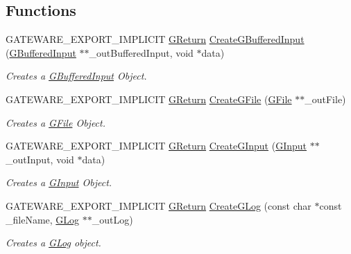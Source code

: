 \subsection*{Functions}
\begin{DoxyCompactItemize}
\item 
G\+A\+T\+E\+W\+A\+R\+E\+\_\+\+E\+X\+P\+O\+R\+T\+\_\+\+I\+M\+P\+L\+I\+C\+IT \hyperlink{namespaceGW_a67a839e3df7ea8a5c5686613a7a3de21}{G\+Return} \hyperlink{namespaceGW_1_1SYSTEM_aa8de0c8b9ee3439fb45a4235a8aaa88f}{Create\+G\+Buffered\+Input} (\hyperlink{classGW_1_1SYSTEM_1_1GBufferedInput}{G\+Buffered\+Input} $\ast$$\ast$\+\_\+out\+Buffered\+Input, void $\ast$data)
\begin{DoxyCompactList}\small\item\em Creates a \hyperlink{classGW_1_1SYSTEM_1_1GBufferedInput}{G\+Buffered\+Input} Object. \end{DoxyCompactList}\item 
G\+A\+T\+E\+W\+A\+R\+E\+\_\+\+E\+X\+P\+O\+R\+T\+\_\+\+I\+M\+P\+L\+I\+C\+IT \hyperlink{namespaceGW_a67a839e3df7ea8a5c5686613a7a3de21}{G\+Return} \hyperlink{namespaceGW_1_1SYSTEM_ac9771a16cab78948d5a495a68977c506}{Create\+G\+File} (\hyperlink{classGW_1_1SYSTEM_1_1GFile}{G\+File} $\ast$$\ast$\+\_\+out\+File)
\begin{DoxyCompactList}\small\item\em Creates a \hyperlink{classGW_1_1SYSTEM_1_1GFile}{G\+File} Object. \end{DoxyCompactList}\item 
G\+A\+T\+E\+W\+A\+R\+E\+\_\+\+E\+X\+P\+O\+R\+T\+\_\+\+I\+M\+P\+L\+I\+C\+IT \hyperlink{namespaceGW_a67a839e3df7ea8a5c5686613a7a3de21}{G\+Return} \hyperlink{namespaceGW_1_1SYSTEM_acec622fdda2c5ed46b2a53b42a50acc3}{Create\+G\+Input} (\hyperlink{classGW_1_1SYSTEM_1_1GInput}{G\+Input} $\ast$$\ast$\+\_\+out\+Input, void $\ast$data)
\begin{DoxyCompactList}\small\item\em Creates a \hyperlink{classGW_1_1SYSTEM_1_1GInput}{G\+Input} Object. \end{DoxyCompactList}\item 
G\+A\+T\+E\+W\+A\+R\+E\+\_\+\+E\+X\+P\+O\+R\+T\+\_\+\+I\+M\+P\+L\+I\+C\+IT \hyperlink{namespaceGW_a67a839e3df7ea8a5c5686613a7a3de21}{G\+Return} \hyperlink{namespaceGW_1_1SYSTEM_a11f58ef9ffaf1ffbce25562bd5a10bc3}{Create\+G\+Log} (const char $\ast$const \+\_\+file\+Name, \hyperlink{classGW_1_1SYSTEM_1_1GLog}{G\+Log} $\ast$$\ast$\+\_\+out\+Log)
\begin{DoxyCompactList}\small\item\em Creates a \hyperlink{classGW_1_1SYSTEM_1_1GLog}{G\+Log} object. \end{DoxyCompactList}\item 

\end{DoxyCompactItemize}
